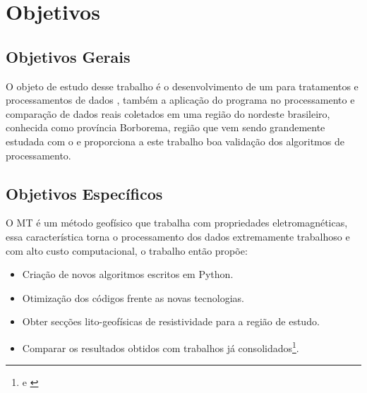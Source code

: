 
\chapter{Objetivos}
\label{cap-objetivos}

\section{Objetivos Gerais}
\label{cap-objetivos gerais}

    
    O objeto de estudo desse trabalho é o desenvolvimento de um  para tratamentos e processamentos de dados \MT, também a aplicação do programa no processamento e comparação de dados reais coletados em uma região do nordeste brasileiro, conhecida como província Borborema, região que vem sendo grandemente estudada com o \MT e proporciona a este trabalho boa validação dos algoritmos de processamento.

\section{Objetivos Específicos}
\label{cap-objetivos especificos}

    O MT é um método geofísico que trabalha com propriedades eletromagnéticas, essa característica torna o processamento dos dados extremamente trabalhoso e com alto custo computacional, o trabalho então propõe:
    
    \begin{itemize}
     \item Criação de novos algoritmos escritos em Python.
     \item Otimização dos códigos frente as novas tecnologias.
     \item Obter secções lito-geofísicas de resistividade para a região de estudo.
     \item Comparar os resultados obtidos com trabalhos já consolidados\footnote{\cite{tese_andrea} e \cite{alane}}.
    \end{itemize}
